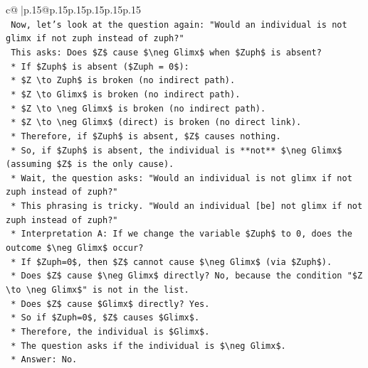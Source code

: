 \documentclass{article}
\begin{document}
{\begin{supertabular}{c@{$\;$}|p{.15\linewidth}@{}p{.15\linewidth}p{.15\linewidth}p{.15\linewidth}p{.15\linewidth}p{.15\linewidth}}
{{{\\ 
\texttt{    Now, let's look at the question again: "Would an individual is not glimx if not zuph instead of zuph?"} \\
\texttt{    This asks: Does \$Z\$ cause \$\textbackslash{}neg Glimx\$ when \$Zuph\$ is absent?} \\
\texttt{    *   If \$Zuph\$ is absent (\$Zuph = 0\$):} \\
\texttt{        *   \$Z \textbackslash{}to Zuph\$ is broken (no indirect path).} \\
\texttt{        *   \$Z \textbackslash{}to Glimx\$ is broken (no indirect path).} \\
\texttt{        *   \$Z \textbackslash{}to \textbackslash{}neg Glimx\$ is broken (no indirect path).} \\
\texttt{        *   \$Z \textbackslash{}to \textbackslash{}neg Glimx\$ (direct) is broken (no direct link).} \\
\texttt{    *   Therefore, if \$Zuph\$ is absent, \$Z\$ causes nothing.} \\
\texttt{    *   So, if \$Zuph\$ is absent, the individual is **not** \$\textbackslash{}neg Glimx\$ (assuming \$Z\$ is the only cause).} \\
\texttt{    *   Wait, the question asks: "Would an individual is not glimx if not zuph instead of zuph?"} \\
\texttt{    *   This phrasing is tricky. "Would an individual {[}be{]} not glimx if not zuph instead of zuph?"} \\
\texttt{    *   Interpretation A: If we change the variable \$Zuph\$ to 0, does the outcome \$\textbackslash{}neg Glimx\$ occur?} \\
\texttt{        *   If \$Zuph=0\$, then \$Z\$ cannot cause \$\textbackslash{}neg Glimx\$ (via \$Zuph\$).} \\
\texttt{        *   Does \$Z\$ cause \$\textbackslash{}neg Glimx\$ directly? No, because the condition "\$Z \textbackslash{}to \textbackslash{}neg Glimx\$" is not in the list.} \\
\texttt{        *   Does \$Z\$ cause \$Glimx\$ directly? Yes.} \\
\texttt{        *   So if \$Zuph=0\$, \$Z\$ causes \$Glimx\$.} \\
\texttt{        *   Therefore, the individual is \$Glimx\$.} \\
\texttt{        *   The question asks if the individual is \$\textbackslash{}neg Glimx\$.} \\
\texttt{        *   Answer: No.} \\
}}}
\end{supertabular}}
\end{document}
